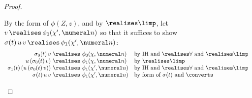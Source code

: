 \begin{proof}
\begin{itemize}
        By the form of $\phi(Z,z)$, and by $\realises\limp$, let $v\, \realises\, \phi_0(\chi',\numeral n)$ so that it suffices to show $\sigma(t)\, u\, v\, \realises\, \phi_1(\chi', \numeral n)$:
        \[
        \begin{array}{r@{\ \realises\ }ll}
             \sigma_0(t)\, v & \phi_0 (\chi,\numeral n) & \text{by IH and $\realises\forall $ and $\realises\limp$} \\
             u\, (\sigma_0(t)\, v) & \phi_1(\chi,\numeral n) & \text{by $\realises\limp$} \\
             \sigma_1(t)\, (u\, (\sigma_0(t)\, v)) & \phi_1(\chi',\numeral n) & \text{by IH and $\realises\forall$ and $\realises\limp$} \\
             \sigma(t)\, u\, v & \phi_1(\chi',\numeral n) & \text{by form of $\sigma(t)$ and $\converts$}
        \end{array}
        \]
        

\end{itemize}
\end{proof}
